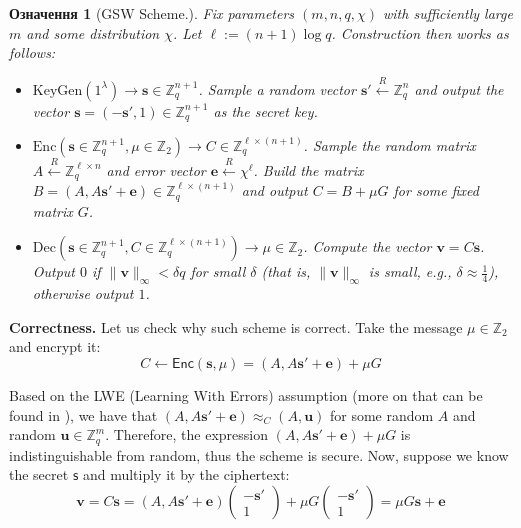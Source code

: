 \documentclass[12pt,a4paper,oneside]{book}
\theoremstyle{dplplain}
\theoremstyle{dpldefinition}
\newtheorem{definition}[theorem]{Означення}%
\theoremstyle{dplremark}
\begin{document}
\begin{definition}[GSW Scheme.]
    Fix parameters $(m,n,q,\chi)$ with sufficiently large $m$ and some
    distribution $\chi$. Let $\ell := (n+1)\log q$. Construction then works as
    follows:
    \begin{itemize}
        \item $\mathrm{KeyGen}(1^{\lambda}) \to \mathbf{s} \in
        \mathbb{Z}_q^{n+1}$. Sample a random vector $\mathbf{s}' \xleftarrow{R}
        \mathbb{Z}_q^n$ and output the vector $\mathbf{s} = (-\mathbf{s}',1) \in
        \mathbb{Z}_q^{n+1}$ as the secret key.
        \item $\mathrm{Enc}(\mathbf{s} \in \mathbb{Z}_q^{n+1},\mu \in
        \mathbb{Z}_2) \to C \in \mathbb{Z}_q^{\ell \times (n+1)}$. Sample the 
        random matrix $A \xleftarrow{R} \mathbb{Z}_q^{\ell \times n}$ and 
        error vector $\mathbf{e} \xleftarrow{R} \chi^{\ell}$. Build the 
        matrix $B = (A,A\mathbf{s}'+\mathbf{e}) \in \mathbb{Z}_q^{\ell \times (n+1)}$
        and output $C = B + \mu G$ for some fixed matrix $G$.
        \item $\mathrm{Dec}(\mathbf{s} \in \mathbb{Z}_q^{n+1},C \in
        \mathbb{Z}_q^{\ell \times (n+1)}) \to \mu \in \mathbb{Z}_2$. Compute the
        vector $\mathbf{v} = C\mathbf{s}$. Output $0$ if
        $\|\mathbf{v}\|_{\infty}<\delta q$ for small $\delta$ (that is,
        $\|\mathbf{v}\|_{\infty}$ is small, e.g., $\delta \approx \frac{1}{4}$),
        otherwise output $1$.
    \end{itemize}
\end{definition}

\textbf{Correctness.} Let us check why such scheme is correct. Take the message $\mu \in \mathbb{Z}_2$
and encrypt it:
\begin{equation*}
    C \gets \mathsf{Enc}(\mathbf{s},\mu) = (A,A\mathbf{s}'+\mathbf{e}) + \mu G
\end{equation*}

Based on the LWE (Learning With Errors) assumption (more on that can be found in
\cite{lwe}), we have that $(A,A\mathbf{s}'+\mathbf{e}) \approx_C (A,\mathbf{u})$
for some random $A$ and random $\mathbf{u} \in \mathbb{Z}_q^m$. Therefore, the
expression $(A,A\mathbf{s}'+\mathbf{e}) + \mu G$ is indistinguishable from
random, thus the scheme is secure. Now, suppose we know the secret $\mathsf{s}$
and multiply it by the ciphertext:
\begin{equation*}
    \mathbf{v} = C\mathbf{s} = (A,A\mathbf{s}'+\mathbf{e})\begin{pmatrix}
        -\mathbf{s}' \\ 1
    \end{pmatrix} + \mu G \begin{pmatrix}
        -\mathbf{s}' \\ 1
    \end{pmatrix} = \mu G \mathbf{s} + \mathbf{e}
\end{equation*}
\end{document}

